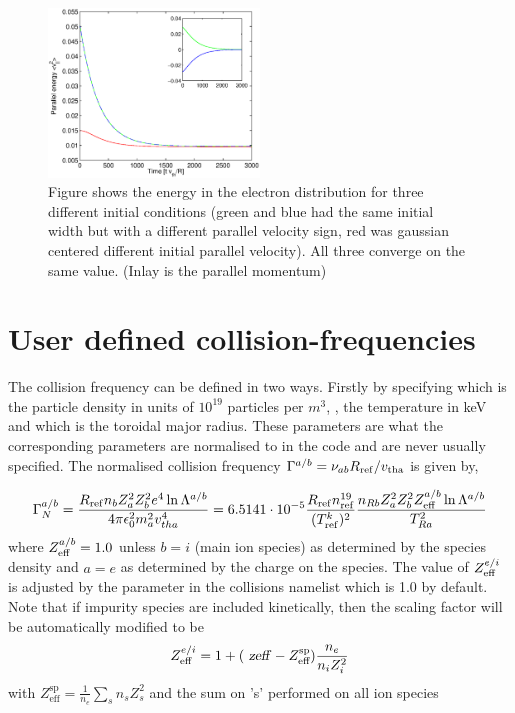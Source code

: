\begin{figure}
\begin{center}
\includegraphics[width=0.5\textwidth]{../benchmarks/collisions/EnergyConvergence.eps}
\caption{Figure shows the energy in the electron distribution for three different initial conditions (green and blue had the same initial width but with a different parallel velocity sign, red was gaussian centered different initial parallel velocity).  
All three converge on the same value. (Inlay is the parallel momentum)}
\end{center}
\end{figure}

\section{User defined collision-frequencies}

The collision frequency can be defined in two ways.  Firstly by specifying  which is the particle density in units of $10^{19}$ particles per $m^{3}$, , the temperature in keV and  which is the toroidal major radius.  These parameters are what the corresponding parameters are normalised to in the code and are never usually specified.  The normalised collision frequency $\Gamma^{a/b}=\nu_{ab} R_{\rm ref}/v_{\rm tha}$ is given by,

\begin{equation} 
\Gamma^{a/b}_N = {R_{\rm ref} n_b Z_a^2 Z_b^2 e^4 \ln \Lambda^{a/b} \over 4 \pi \epsilon_0^2 m_a^2 v_{tha}^4} = 
6.5141\cdot 10^{-5} {R_{\rm ref} n_{\rm ref}^{19} \over (T_{\rm ref}^k)^2}  {n_{Rb} Z_a^2 Z_b^2 Z^{a/b}_{\rm eff}\ln \Lambda^{a/b} 
\over T_{Ra}^2}
\end{equation}
where $Z^{a/b}_{\rm eff} = 1.0 $ unless $b = i$ (main ion species) as determined by the species density and $a = e$ as determined by the charge on the species.
The value of $Z^{e/i}_{\rm eff}$ is adjusted by the parameter  in the collisions namelist which is 1.0 by default. 
Note that if impurity species are included kinetically, then the scaling factor will be automatically modified to be 
\begin{equation}
 Z^{e/i}_{\rm eff} = 1 + (\name{zeff} - Z_\textrm{eff}^\textrm{sp})\frac{n_e}{n_iZ_i^2}
\end{equation}
with $Z_\textrm{eff}^\textrm{sp}=\frac{1}{n_e}\sum_s n_sZ_s^2$ and the sum on 's' performed on all ion species

